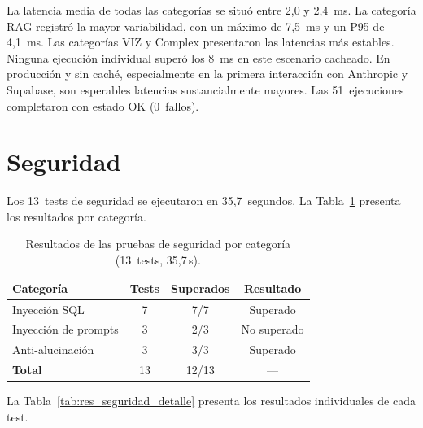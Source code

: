 La latencia media de todas las categorías se situó entre 2,0 y 2,4~ms. La categoría \ac{RAG} registró la mayor variabilidad, con un máximo de 7,5~ms y un P95 de 4,1~ms. Las categorías VIZ y Complex presentaron las latencias más estables. Ninguna ejecución individual superó los 8~ms en este escenario cacheado. En producción y sin caché, especialmente en la primera interacción con Anthropic y Supabase, son esperables latencias sustancialmente mayores. Las 51~ejecuciones completaron con estado OK (0~fallos).


\section{Seguridad}
\label{sec:res_seguridad}

Los 13~tests de seguridad se ejecutaron en 35,7~segundos. La Tabla~\ref{tab:res_seguridad} presenta los resultados por categoría.

\begin{table}[H]
\centering
\caption{Resultados de las pruebas de seguridad por categoría (13~tests, 35,7\,s).}
\label{tab:res_seguridad}
\footnotesize
\begin{tabularx}{\columnwidth}{lccc}
\toprule
\textbf{Categoría} & \textbf{Tests} & \textbf{Superados} & \textbf{Resultado} \\
\midrule
Inyección \ac{SQL}         & 7 & 7/7 & Superado \\
Inyección de prompts  & 3 & 2/3 & No superado \\
Anti-alucinación      & 3 & 3/3 & Superado \\
\midrule
\textbf{Total}        & 13 & 12/13 & --- \\
\bottomrule
\end{tabularx}
\end{table}

La Tabla~\ref{tab:res_seguridad_detalle} presenta los resultados individuales de cada test.

